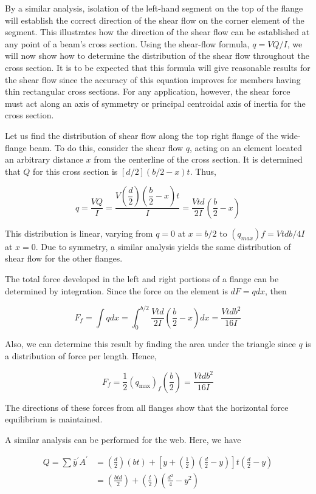 \documentclass[
fontsize=10pt,
a4paper,
twosides=false,
open=any,
svgnames,
]{kaobook} %
\begin{document}
By a similar analysis, isolation of the left-hand segment on the top of the flange will establish the correct direction of the shear flow on the corner element of the segment. This illustrates how the direction of the shear flow can be established at any point of a beam’s cross section. Using the shear-flow formula, $q = VQ/I$, we will now show how to determine the distribution of the shear flow throughout the cross section. It is to be expected that this formula will give reasonable results for the shear flow since the accuracy of this equation improves for members having thin rectangular cross sections. For any application, however, the shear force must act along an axis of symmetry or principal centroidal axis of inertia for the cross section.

Let us find the distribution of shear flow along the top right flange of the wide-flange beam. To do this, consider the shear flow $q$, acting on an element located an arbitrary distance $x$ from the centerline of the cross section. It is determined that $Q$ for this cross section is $[d/2](b/2 - x)t$. Thus,

\[q = \frac{VQ}{I} = \frac{V \left( \dfrac{d}{2} \right)\left( \dfrac{b}{2} - x \right)t}{I} = \frac{Vtd}{2I}\left( \frac{b}{2} - x \right)\]

This distribution is linear, varying from $q = 0$ at $x = b/2$ to $(q_{max})f = Vtdb/4I$ at $x = 0$. Due to symmetry, a similar analysis yields the same distribution of shear flow for the other flanges.

The total force developed in the left and right portions of a flange can be determined by integration. Since the force on the element is $dF = qdx$, then

\[F_f = \int qdx  = \int_0^{b/2} \frac{Vtd}{2I}\left( \frac{b}{2} - x \right)dx  = \frac{Vtdb^2}{16I}\]

Also, we can determine this result by finding the area under the triangle since $q$ is a distribution of force per length. Hence,

\[F_f = \frac{1}{2}(q_{\max })_f\left( \frac{b}{2} \right) = \frac{Vtdb^2}{16I}\]

The directions of these forces from all flanges show that the horizontal force equilibrium is maintained.

A similar analysis can be performed for the web. Here, we have

\begin{align*}
  Q = \sum \bar y^\prime A^\prime  &= \left( \frac{d}{2} \right)(bt) + \left[ y + \left( \frac{1}{2} \right)\left( \frac{d}{2} - y \right) \right]t\left( \frac{d}{2} - y \right) \\ 
                        &= \left( \frac{btd}{2} \right) + \left( \frac{t}{2} \right)\left( \frac{d^2}{4} - y^2 \right)
\end{align*}	
\end{document}
